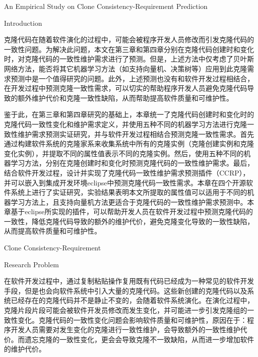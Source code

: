 
{An Empirical Study on Clone Consistency-Requirement Prediction}


{Introduction}

克隆代码在随着软件演化的过程中，可能会被程序开发人员修改而引发克隆代码的一致性问题。为解决此问题，本文在第三章和第四章分别在克隆代码创建时和变化时，对克隆代码的一致性维护需求进行了预测。但是，上述方法中仅考虑了贝叶斯网络方法，能否将其它机器学习方法（如支持向量机、决策树等）应用到此克隆需求预测中是一个值得研究的问题。此外，上述预测也没有和软件开发过程相结合，在开发过程中预测克隆一致性需求，可以切实的帮助程序开发人员避免克隆代码导致的额外维护代价和克隆一致性缺陷，从而帮助提高软件质量和可维护性。

鉴于此，在第三章和第四章研究的基础上，本章统一了克隆代码创建时和变化时的克隆代码一致性变化和维护需求定义，并使用五种不同的机器学习方法进行克隆一致性维护需求预测实证研究，并与软件开发过程相结合预测克隆一致性需求。首先通过构建软件系统的克隆家系来收集系统中所有的克隆实例（克隆创建实例和克隆变化实例），并提取不同的属性值表示不同的克隆实例。然后，使用五种不同的机器学习方法，分别在克隆创建时和变化时预测克隆代码的一致性维护需求。最后，结合软件开发过程，设计并实现了克隆代码一致性维护需求预测插件（CCRP），并可以嵌入到集成开发环境eclipse中预测克隆代码一致性需求。本章在四个开源软件系统上进行了实证研究，实验结果表明本文所提取的属性值可以适用于不同的机器学习方法上，且支持向量机方法更适合于克隆代码的一致性维护需求预测中。本章基于eclipse所实现的插件，可以帮助开发人员在软件开发过程中预测克隆代码的一致性，降低克隆代码导致的额外的维护代价，避免克隆变化导致的一致性缺陷，从而提高软件质量和可维护性。



{Clone Consistency-Requirement}

{Research Problem}

在软件开发过程中，通过复制粘贴操作复用既有代码已经成为一种常见的软件开发手段，但是也会向软件系统中引入大量的克隆代码。这些新创建的克隆代码以及系统已经存在的克隆代码并不是静止不变的，会随着软件系统演化。在演化过程中，克隆片段片段可能会被软件开发员修改而发生变化，并可能进一步引发克隆组的一致性变化。克隆代码的一致性变化问题会影响软件质量和可维护性，原因在于：程序开发人员需要对发生变化的克隆进行一致性维护，会导致额外的一致性维护代价。而遗忘克隆的一致性变化，更会会导致克隆不一致缺陷，从而进一步增加软件的维护代价。


